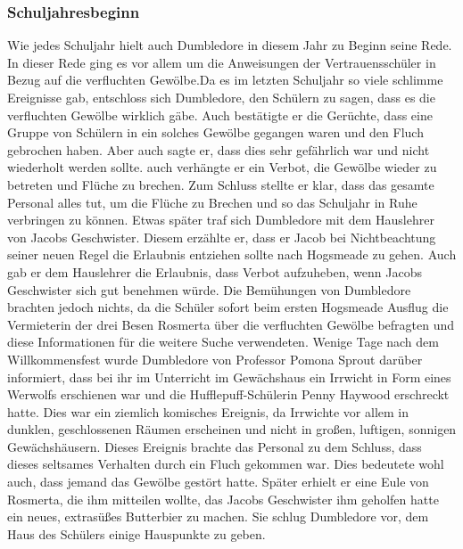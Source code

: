 \documentclass[a4paper, 10pt]{article}
\begin{document}
\subsubsection*{Schuljahresbeginn}
Wie jedes Schuljahr hielt auch Dumbledore in diesem Jahr zu Beginn seine Rede. In dieser Rede ging es vor allem um die Anweisungen der Vertrauensschüler in Bezug auf die verfluchten Gewölbe.Da es im letzten Schuljahr so viele schlimme Ereignisse gab, entschloss sich Dumbledore, den Schülern zu sagen, dass es die verfluchten Gewölbe wirklich gäbe. Auch bestätigte er die Gerüchte, dass eine Gruppe von Schülern in ein solches Gewölbe gegangen waren und den Fluch gebrochen haben. Aber auch sagte er, dass dies sehr gefährlich war und nicht wiederholt werden sollte. auch verhängte er ein Verbot, die Gewölbe wieder zu betreten und Flüche zu brechen. Zum Schluss stellte er klar, dass das gesamte Personal alles tut, um die Flüche zu Brechen und so das Schuljahr in Ruhe verbringen zu können.
\vspace{10pt}
\newline
{}  
Etwas später traf sich Dumbledore mit dem Hauslehrer von Jacobs Geschwister. Diesem erzählte er, dass er Jacob bei Nichtbeachtung seiner neuen Regel die Erlaubnis entziehen sollte nach Hogsmeade zu gehen. Auch gab er dem Hauslehrer die Erlaubnis, dass Verbot aufzuheben, wenn Jacobs Geschwister sich gut benehmen würde. Die Bemühungen von Dumbledore brachten jedoch nichts, da die Schüler sofort beim ersten Hogsmeade Ausflug die Vermieterin der drei Besen Rosmerta über die verfluchten Gewölbe befragten und diese Informationen für die weitere Suche verwendeten.
\vspace{10pt}
\newline
{}  
Wenige Tage nach dem Willkommensfest wurde Dumbledore von Professor Pomona Sprout darüber informiert, dass bei ihr im Unterricht im Gewächshaus ein Irrwicht in Form eines Werwolfs erschienen war und die Hufflepuff-Schülerin Penny Haywood erschreckt hatte. Dies war ein ziemlich komisches Ereignis, da Irrwichte vor allem in dunklen, geschlossenen Räumen erscheinen und nicht in großen, luftigen, sonnigen Gewächshäusern. Dieses Ereignis brachte das Personal zu dem Schluss, dass dieses seltsames Verhalten durch ein Fluch gekommen war. Dies bedeutete wohl auch, dass jemand das Gewölbe gestört hatte. Später erhielt er eine Eule von Rosmerta, die ihm mitteilen wollte, das Jacobs Geschwister ihm geholfen hatte ein neues, extrasüßes Butterbier zu machen. Sie schlug Dumbledore vor, dem Haus des Schülers einige Hauspunkte zu geben.
\end{document}

